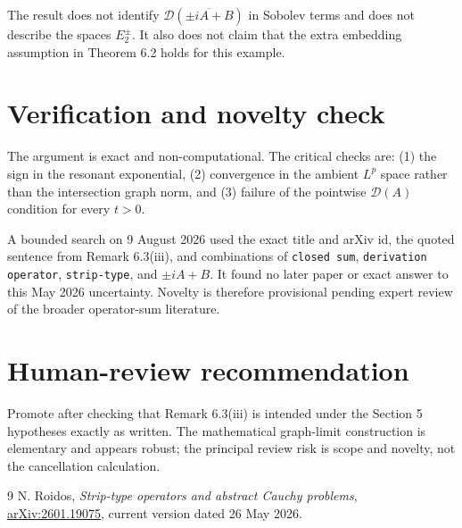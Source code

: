 \documentclass[11pt]{article}
\newcommand{\D}{\mathcal D}
\begin{document}
The result does not identify $\D(\overline{\pm iA+B})$ in Sobolev terms and
does not describe the spaces $E_2^\pm$.  It also does not claim that the extra
embedding assumption in Theorem 6.2 holds for this example.

\section{Verification and novelty check}
The argument is exact and non-computational.  The critical checks are:
(1) the sign in the resonant exponential, (2) convergence in the ambient
$L^p$ space rather than the intersection graph norm, and (3) failure of the
pointwise $\D(A)$ condition for every $t>0$.

A bounded search on 9 August 2026 used the exact title and arXiv id, the quoted
sentence from Remark 6.3(iii), and combinations of
\texttt{closed sum}, \texttt{derivation operator}, \texttt{strip-type}, and
\texttt{$\pm iA+B$}.  It found no later paper or exact answer to this May 2026
uncertainty.  Novelty is therefore provisional pending expert review of the
broader operator-sum literature.

\section{Human-review recommendation}
Promote after checking that Remark 6.3(iii) is intended under the Section 5
hypotheses exactly as written.  The mathematical graph-limit construction is
elementary and appears robust; the principal review risk is scope and novelty,
not the cancellation calculation.

\begin{thebibliography}{9}
N. Roidos,
\emph{Strip-type operators and abstract Cauchy problems},
\href{https://arxiv.org/abs/2601.19075}{arXiv:2601.19075}, current version dated
26 May 2026.
\end{thebibliography}
\end{document}
